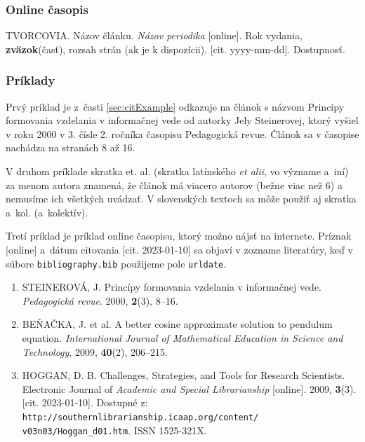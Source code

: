 \subsubsection*{\normalsize Online časopis}
\begin{trivlist}
\item TVORCOVIA. Názov článku. \textit{Názov periodika} [online]. Rok vydania, \textbf{zväzok}(časť), rozsah strán (ak je k dispozícii). [cit. yyyy-mm-dd]. Dostupnosť.
\end{trivlist}

\subsubsection*{\normalsize Príklady}
Prvý príklad je z~časti
\ref{sec:citExample} odkazuje na článok s názvom Princípy formovania vzdelania v informačnej vede od autorky Jely Steinerovej, ktorý vyšiel v roku 2000 v 3. čísle 2. ročníka časopisu Pedagogická revue. Článok sa v časopise nachádza na stranách 8 až 16.

V druhom príklade skratka et. al. (skratka latínského \textit{et alii}, vo význame a~iní) za menom autora znamená, že článok má viacero autorov (bežne viac než 6) a nemusíme ich všetkých uvádzať.
V slovenských textoch sa môže použiť aj skratka a~kol. (a~kolektív).

Tretí príklad je príklad online časopisu, ktorý možno nájsť na internete. Príznak [online] a~dátum citovania [cit. 2023-01-10] sa objaví v zozname literatúry, keď v súbore \verb|bibliography.bib| použijeme pole \verb|urldate|.

\begin{enumerate}
\item STEINEROVÁ, J. Princípy formovania vzdelania v informačnej vede. \textit{Pedagogická revue}. 2000, \textbf{2}(3), 8–16.
\item BEŇAČKA, J. et al. A better cosine approximate solution to pendulum equation. \textit{International Journal of Mathematical Education in Science and Technology}, 2009, \textbf{40}(2), 206–215.
\item HOGGAN, D. B. Challenges, Strategies, and Tools for Research Scientists. Electronic Journal of \textit{Academic and Special Librarianship} [online]. 2009, \textbf{3}(3). [cit. 2023-01-10]. Dostupné z: \texttt{http://southernlibrarianship.icaap.org/content/ v03n03/Hoggan\_d01.htm}. ISSN 1525-321X. 
\end{enumerate}

